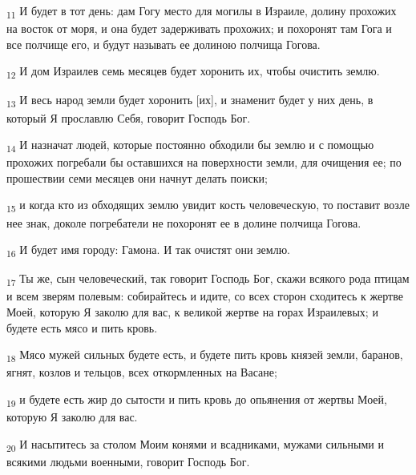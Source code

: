 \begin{tcolorbox}
\textsubscript{11} И будет в тот день: дам Гогу место для могилы в Израиле, долину прохожих на восток от моря, и она будет задерживать прохожих; и похоронят там Гога и все полчище его, и будут называть ее долиною полчища Гогова.
\end{tcolorbox}
\begin{tcolorbox}
\textsubscript{12} И дом Израилев семь месяцев будет хоронить их, чтобы очистить землю.
\end{tcolorbox}
\begin{tcolorbox}
\textsubscript{13} И весь народ земли будет хоронить [их], и знаменит будет у них день, в который Я прославлю Себя, говорит Господь Бог.
\end{tcolorbox}
\begin{tcolorbox}
\textsubscript{14} И назначат людей, которые постоянно обходили бы землю и с помощью прохожих погребали бы оставшихся на поверхности земли, для очищения ее; по прошествии семи месяцев они начнут делать поиски;
\end{tcolorbox}
\begin{tcolorbox}
\textsubscript{15} и когда кто из обходящих землю увидит кость человеческую, то поставит возле нее знак, доколе погребатели не похоронят ее в долине полчища Гогова.
\end{tcolorbox}
\begin{tcolorbox}
\textsubscript{16} И будет имя городу: Гамона. И так очистят они землю.
\end{tcolorbox}
\begin{tcolorbox}
\textsubscript{17} Ты же, сын человеческий, так говорит Господь Бог, скажи всякого рода птицам и всем зверям полевым: собирайтесь и идите, со всех сторон сходитесь к жертве Моей, которую Я заколю для вас, к великой жертве на горах Израилевых; и будете есть мясо и пить кровь.
\end{tcolorbox}
\begin{tcolorbox}
\textsubscript{18} Мясо мужей сильных будете есть, и будете пить кровь князей земли, баранов, ягнят, козлов и тельцов, всех откормленных на Васане;
\end{tcolorbox}
\begin{tcolorbox}
\textsubscript{19} и будете есть жир до сытости и пить кровь до опьянения от жертвы Моей, которую Я заколю для вас.
\end{tcolorbox}
\begin{tcolorbox}
\textsubscript{20} И насытитесь за столом Моим конями и всадниками, мужами сильными и всякими людьми военными, говорит Господь Бог.
\end{tcolorbox}
